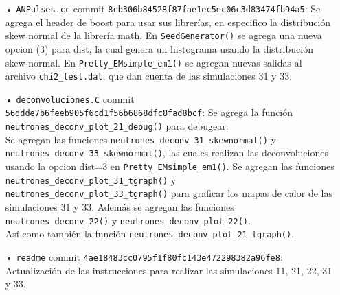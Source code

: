 \documentclass[11pt,letterpaper]{article}
\begin{document}
\begin{itemize}
\item[•] \verb|ANPulses.cc| commit \verb|8cb306b84528f87fae1ec5ec06c3d83474fb94a5|: Se agrega el header de boost para usar sus librerías, en especifico la distribución skew normal de la librería math. En \verb|SeedGenerator()| se agrega una nueva opcion (3) para dist, la cual genera un histograma usando la distribución skew normal. En \verb|Pretty_EMsimple_em1()| se agregan nuevas salidas al archivo \verb|chi2_test.dat|, que dan cuenta de las simulaciones 31 y 33.
\item[•] \verb|deconvoluciones.C| commit \verb|56ddde7b6feeb905f6cd1f56b6868dfc8fad8bcf|: Se agrega la función \verb|neutrones_deconv_plot_21_debug()| para debugear. \\
Se agregan las funciones \verb|neutrones_deconv_31_skewnormal()| y \verb|neutrones_deconv_33_skewnormal()|, las cuales realizan las deconvoluciones usando la opcion dist=3 en \verb|Pretty_EMsimple_em1()|. Se agregan las funciones \verb|neutrones_deconv_plot_31_tgraph()| y \verb|neutrones_deconv_plot_33_tgraph()| para graficar los mapas de calor de las simulaciones 31 y 33.
Además se agregan las funciones \verb|neutrones_deconv_22()| y \verb|neutrones_deconv_plot_22()|.\\
 Así como también la función \verb|neutrones_deconv_plot_21_tgraph()|.
\item[•] \verb|readme| commit \verb|4ae18483cc0795f1f80fc143e472298382a96fe8|: Actualización de las instrucciones para realizar las simulaciones 11, 21, 22, 31 y 33.


\end{itemize}
\end{document}
